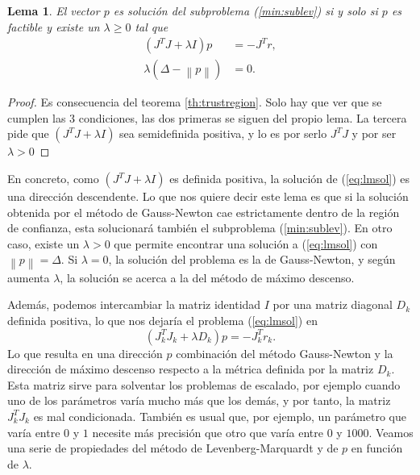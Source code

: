 \documentclass[11pt,a4paper]{book}
\newtheorem{lemma}[theorem]{Lema}
\theoremstyle{definition}
\theoremstyle{remark}
\newcommand{\norm}[1]{\left\lVert#1\right\rVert}
\begin{document}
\begin{lemma}
El vector $p$ es solución del subproblema (\ref{min:sublev}) si y solo si $p$ es factible y existe un $\lambda \geq 0$ tal que
\begin{align}
	(J^TJ+\lambda I)p&=-J^Tr, \label{eq:lmsol}\\
	\lambda (\Delta-\norm{p})&=0.
\end{align}
\end{lemma}
\begin{proof}
Es consecuencia del teorema \ref{th:trustregion}. Solo hay que ver que se cumplen las 3 condiciones, las dos primeras se siguen del propio lema. La tercera pide que $(J^TJ+\lambda I)$ sea semidefinida positiva, y lo es por serlo $J^TJ$ y por ser $\lambda>0$
\end{proof}

En concreto, como $(J^TJ+\lambda I)$ es definida positiva, la solución de (\ref{eq:lmsol}) es una dirección descendente. Lo que nos quiere decir este lema es que si la solución obtenida por el método de Gauss-Newton cae estrictamente dentro de la región de confianza, esta solucionará también el subproblema (\ref{min:sublev}).
En otro caso, existe un $\lambda>0$ que permite encontrar una solución a (\ref{eq:lmsol})
con $\norm{p}=\Delta$. Si $\lambda=0$, la solución del problema es la de Gauss-Newton, y según aumenta $\lambda$, la solución se acerca a la del método de máximo descenso.

Además, podemos intercambiar la matriz identidad $I$ por una matriz diagonal $D_k$ definida positiva, lo que nos dejaría el problema (\ref{eq:lmsol}) en
\begin{equation}
	(J_k^TJ_k+\lambda D_k)p = -J_k^Tr_k.
\end{equation}
Lo que resulta en una dirección $p$ combinación del método Gauss-Newton y la dirección de máximo descenso respecto a la métrica definida por la matriz $D_k$.
Esta matriz sirve para solventar los problemas de escalado, por ejemplo cuando uno de los parámetros varía mucho más que los demás, y por tanto, la matriz $J_k^TJ_k$ es mal condicionada. También es usual que, por ejemplo, un parámetro que varía entre $0$ y $1$ necesite más precisión que otro que varía entre $0$ y $1000$.
Veamos una serie de propiedades del método de Levenberg-Marquardt y de $p$ en función de $\lambda$. 
\end{document}
